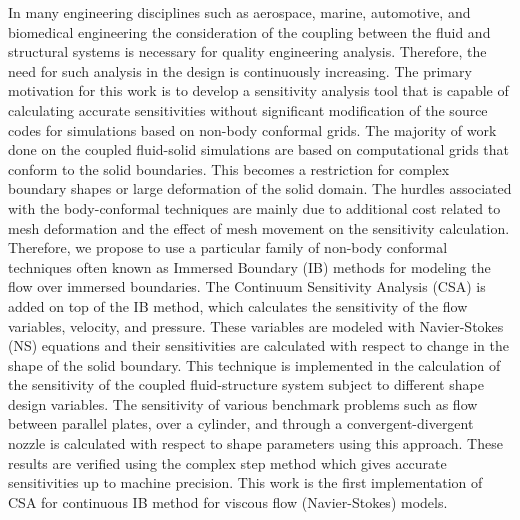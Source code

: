 In many engineering disciplines such as aerospace, marine, automotive, and biomedical engineering the consideration of the coupling between the fluid and structural systems is necessary for quality engineering analysis. Therefore, the need for such analysis in the design is continuously increasing. The primary motivation for this work is to develop a sensitivity analysis tool that is capable of calculating accurate sensitivities without significant modification of the source codes for simulations based on non-body conformal grids. The majority of work done on the coupled fluid-solid simulations are based on computational grids that conform to the solid boundaries. This becomes a restriction for complex boundary shapes or large deformation of the solid domain. The hurdles associated with the body-conformal techniques are mainly due to additional cost related to mesh deformation and the effect of mesh movement on the sensitivity calculation. Therefore, we propose to use a particular family of non-body conformal techniques often known as Immersed Boundary (IB) methods for modeling the flow over immersed boundaries. The Continuum Sensitivity Analysis (CSA) is added on top of the IB method, which calculates the sensitivity of the flow variables, velocity, and pressure. These variables are modeled with Navier-Stokes (NS) equations and their sensitivities are calculated with respect to change in the shape of the solid boundary. This technique is implemented in the calculation of the sensitivity of the coupled fluid-structure system subject to different shape design variables. The sensitivity of various benchmark problems such as flow between parallel plates, over a cylinder, and through a convergent-divergent nozzle is calculated with respect to shape parameters using this approach. These results are verified using the complex step method which gives accurate sensitivities up to machine precision. This work is the first implementation of CSA for continuous IB method for viscous flow (Navier-Stokes) models.
